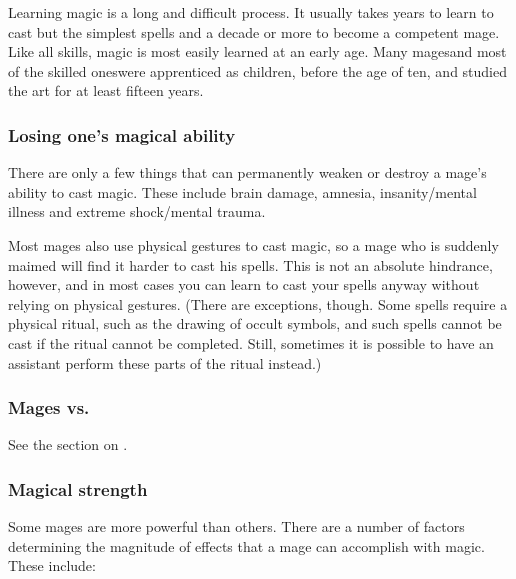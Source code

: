 Learning magic is a long and difficult process. It usually takes years to learn to cast but the simplest spells and a decade or more to become a competent mage. Like all skills, magic is most easily learned at an early age. Many mages\dash{}and most of the skilled ones\dash{}were apprenticed as children, before the age of ten, and studied the art for at least fifteen years. 





\subsubsection{Losing one's magical ability}
There are only a few things that can permanently weaken or destroy a mage's ability to cast magic. These include brain damage, amnesia, insanity/mental illness and extreme shock/mental trauma. 

Most mages also use physical gestures to cast magic, so a mage who is suddenly maimed will find it harder to cast his spells. This is not an absolute hindrance, however, and in most cases you can learn to cast your spells anyway without relying on physical gestures. (There are exceptions, though. Some spells require a physical ritual, such as the drawing of occult symbols, and such spells cannot be cast if the ritual cannot be completed. Still, sometimes it is possible to have an assistant perform these parts of the ritual instead.)





\subsubsection{Mages vs. \vertices}
See the section on . 





\subsubsection{Magical strength}
Some mages are more powerful than others. There are a number of factors determining the magnitude of effects that a mage can accomplish with magic. These include: 

